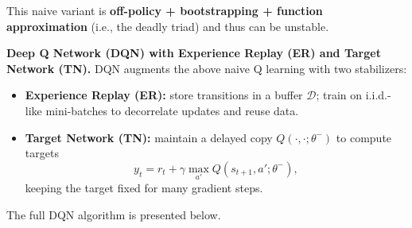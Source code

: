 \documentclass[
]{book}
\theoremstyle{definition}
\theoremstyle{definition}
\theoremstyle{definition}
\theoremstyle{definition}
\theoremstyle{remark}
\begin{document}
This naive variant is \textbf{off-policy + bootstrapping + function approximation} (i.e., the deadly triad) and thus can be unstable.

\textbf{Deep Q Network (DQN) with Experience Replay (ER) and Target Network (TN).} DQN augments the above naive Q learning with two stabilizers:

\begin{itemize}
\item
  \textbf{Experience Replay (ER):} store transitions in a buffer \(\mathcal{D}\); train on i.i.d.-like mini-batches to decorrelate updates and reuse data.
\item
  \textbf{Target Network (TN):} maintain a delayed copy \(Q(\cdot,\cdot; \theta^-)\) to compute targets
  \[
  y_t = r_t + \gamma \max_{a'} Q(s_{t+1},a';\theta^-),
  \]
  keeping the target fixed for many gradient steps.
\end{itemize}

The full DQN algorithm is presented below.
\end{document}
